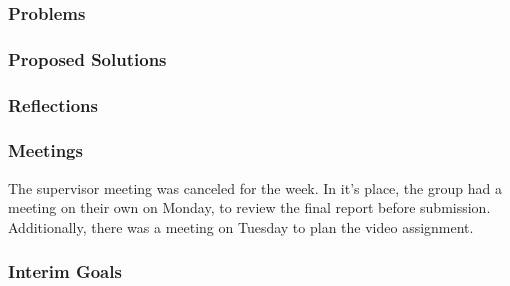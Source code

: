 \subsubsection{Problems}


\subsubsection{Proposed Solutions}


\subsubsection{Reflections}

    

\subsubsection{Meetings}

    The supervisor meeting was canceled for the week. In it's place, the group had a meeting on their own on Monday, to review the final report before submission. Additionally, there was a meeting on Tuesday to plan the video assignment.

\subsubsection{Interim Goals}


